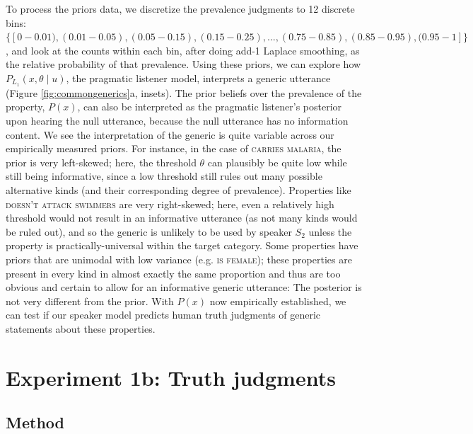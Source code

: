 \documentclass[12pt,letterpaper]{article}
\begin{document}
To process the priors data, we discretize the prevalence judgments to 12 discrete bins: $\{[0-0.01), (0.01-0.05), (0.05-0.15), (0.15-0.25),  ..., (0.75-0.85), (0.85-0.95), (0.95-1]\}$, and look at the counts within each bin, after doing add-1 Laplace smoothing, as the relative probability of that prevalence. 
Using these priors, we can explore how $P_{L_{1}}(x , \theta \mid u)$, the pragmatic listener model, interprets a generic utterance (Figure \ref{fig:commongenerics}a, insets). 
The prior beliefs over the prevalence of the property, $P(x)$, can also be interpreted as the pragmatic listener's posterior upon hearing the null utterance, because the null utterance has no information content.
We see the interpretation of the generic is quite variable across our empirically measured priors.
For instance, in the case of \textsc{carries malaria}, the prior is very left-skewed; here, the threshold $\theta$ can plausibly be quite low while still being informative, since a low threshold still rules out many possible alternative kinds (and their corresponding degree of prevalence).
Properties like \textsc{doesn't attack swimmers} are very right-skewed; here, even a relatively high threshold would not result in an informative utterance (as not many kinds would be ruled out), and so the generic is unlikely to be used by speaker $S_2$ unless the property is practically-universal within the target category. 
Some properties have priors that are unimodal with low variance (e.g. \textsc{is female}); these properties are present in every kind in almost exactly the same proportion and thus are too obvious and certain to allow for an informative generic utterance: The posterior is not very different from the prior. 
With $P(x)$ now empirically established, we can test if our speaker model predicts human truth judgments of generic statements about these properties.


\section*{Experiment 1b: Truth judgments}



\subsection*{Method}
\end{document}
